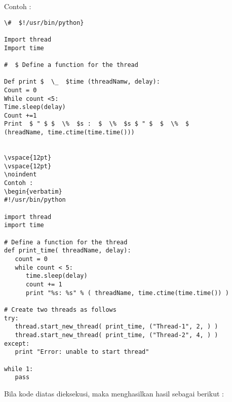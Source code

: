 \documentclass [12pt,a4paper,notitlepage,oneside,bahasa]{article}
\begin{document}
\vspace{12pt}
Contoh : 
\begin{verbatim}
\#  $!/usr/bin/python} 

Import thread
Import time

#  $ Define a function for the thread 

Def print $  \_  $time (threadNamw, delay):
Count = 0
While count <5:
Time.sleep(delay)
Count +=1 
Print  $ " $ $  \%  $s :  $  \%  $s $ " $  $  \%  $ 
(hreadName, time.ctime(time.time()))


\vspace{12pt}
\vspace{12pt}
\noindent 
Contoh : 
\begin{verbatim}
#!/usr/bin/python

import thread
import time

# Define a function for the thread
def print_time( threadName, delay):
   count = 0
   while count < 5:
      time.sleep(delay)
      count += 1
      print "%s: %s" % ( threadName, time.ctime(time.time()) )

# Create two threads as follows
try:
   thread.start_new_thread( print_time, ("Thread-1", 2, ) )
   thread.start_new_thread( print_time, ("Thread-2", 4, ) )
except:
   print "Error: unable to start thread"

while 1:
   pass
\end{verbatim}
	
	
	
	\newpage
	
	Bila kode diatas dieksekusi, maka menghasilkan hasil sebagai berikut : \par
\end{document}

